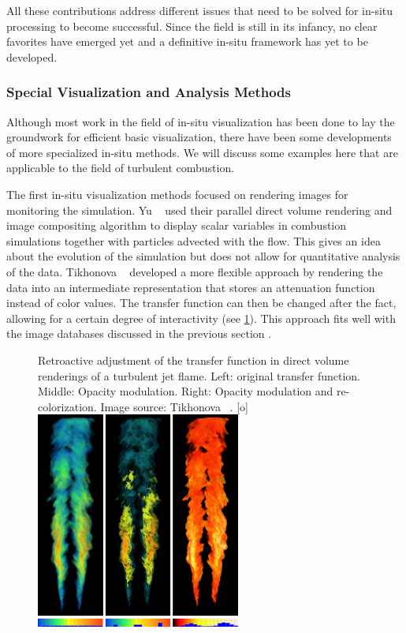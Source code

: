 %
All these contributions address different issues that need to be solved for
in-situ processing to become successful.
%
Since the field is still in its infancy, no clear favorites have emerged yet and
a definitive in-situ framework has yet to be developed.
%
%
\subsubsection{Special Visualization and Analysis Methods} %
\label{ssub:visualization_and_analysis_methods}
%
Although most work in the field of in-situ visualization has been done to lay
the groundwork for efficient basic visualization, there have been some
developments of more specialized in-situ methods.
%
We will discuss some examples here that are applicable to the field of turbulent
combustion.
%

%
The first in-situ visualization methods focused on rendering images for
monitoring the simulation.
%
Yu \etal~\cite{Yu2010} used their parallel direct volume rendering and image
compositing algorithm \cite{Yu2008} to display scalar variables in combustion
simulations together with particles advected with the flow.
%
This gives an idea about the evolution of the simulation but does not allow for
quantitative analysis of the data.
%
Tikhonova \etal~\cite{Tikhonova2011} developed a more flexible approach by
rendering the data into an intermediate representation that stores an
attenuation function instead of color values.
%
The transfer function can then be changed after the fact, allowing for a certain
degree of interactivity (see \cref{fig:tikhonova_tf}).
%
This approach fits well with the image databases discussed in the previous
section \cite{Kageyama2014,Ahrens2014}.
%
\begin{figure}[t]
    \begin{captionbeside}{
        Retroactive adjustment of the transfer function in direct volume
        renderings of a turbulent jet flame. Left: original transfer function.
        Middle: Opacity modulation. Right: Opacity modulation and
        re-colorization. Image source: Tikhonova \etal~\cite{Tikhonova2011}.
        \label{fig:tikhonova_tf}
    }[o]
        \includegraphics[width=0.6\textwidth]{figures/tikhonova_transfer_function.png}
    \end{captionbeside}
\end{figure}
%

